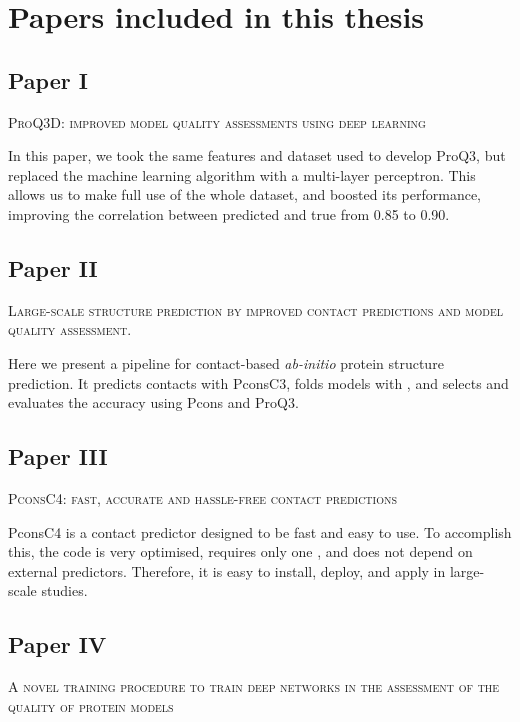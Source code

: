 \chapter{Papers included in this thesis}

\section*{Paper I}
\begin{center}
	\textsc{ProQ3D: improved model quality assessments using deep learning}
\end{center}
\noindent
In this paper, we took the same features and dataset used to develop ProQ3, but replaced the machine learning algorithm with a multi-layer perceptron.
This allows us to make full use of the whole dataset, and boosted its performance, improving the correlation between predicted and true from 0.85 to 0.90.

\section*{Paper II}
\begin{center}
	\textsc{Large-scale structure prediction by improved contact predictions and model quality assessment.}
\end{center}

\noindent
Here we present a pipeline for contact-based \emph{ab-initio} protein structure prediction.
It predicts contacts with PconsC3, folds models with \CONFOLD, and selects and evaluates the accuracy using Pcons and ProQ3.
\newpage
\section*{Paper III}
\begin{center}
	\textsc{PconsC4: fast, accurate and hassle-free contact predictions}
\end{center}

\noindent
PconsC4 is a contact predictor designed to be fast and easy to use.
To accomplish this, the code is very optimised, requires only one \MSA, and does not depend on external predictors.
Therefore, it is easy to install, deploy, and apply in large-scale studies.


\section*{Paper IV}
\begin{center}
	\textsc{A novel training procedure to train deep networks in the assessment of the quality of protein models}
\end{center}

